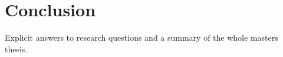 \section{Conclusion}
Explicit answers to research questions and a summary of the whole masters thesis.


